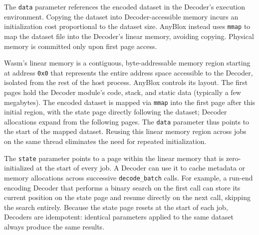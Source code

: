 The \texttt{data} parameter references the encoded dataset in the Decoder's execution environment. Copying the dataset into Decoder-accessible memory incurs an initialization cost proportional to the dataset size. AnyBlox instead uses \texttt{mmap} to map the dataset file into the Decoder's linear memory, avoiding copying. Physical memory is committed only upon first page access.

Wasm's linear memory is a contiguous, byte-addressable memory region starting at address \texttt{0x0} that represents the entire address space accessible to the Decoder, isolated from the rest of the host process. AnyBlox controls its layout. The first pages hold the Decoder module's code, stack, and static data (typically a few megabytes). The encoded dataset is mapped via \texttt{mmap} into the first page after this initial region, with the state page directly following the dataset; Decoder allocations expand from the following pages. The \texttt{data} parameter thus points to the start of the mapped dataset. Reusing this linear memory region across jobs on the same thread eliminates the need for repeated initialization.

The \texttt{state} parameter points to a page within the linear memory that is zero-initialized at the start of every job. A Decoder can use it to cache metadata or memory allocations across successive \texttt{decode\_batch} calls. For example, a run-end encoding Decoder that performs a binary search on the first call can store its current position on the state page and resume directly on the next call, skipping the search entirely. Because the state page resets at the start of each job, Decoders are idempotent: identical parameters applied to the same dataset always produce the same results.

